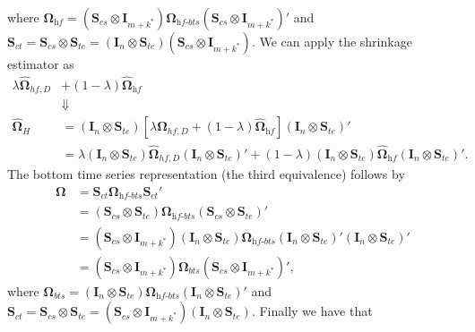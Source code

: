 \documentclass[a4paper,11pt]{article}
\newcommand{\Ivet}{\bm{I}}
\newcommand{\Svet}{\bm{S}}
\newcommand{\Omegavet}{\bm{\Omega}}
\theoremstyle{definition}
\begin{document}
where $\Omegavet_{\textit{hf}} = \left(\Svet_{cs} \otimes \Ivet_{m+k^\ast}\right)\Omegavet_{\textit{hf-bts}}\left(\Svet_{cs} \otimes \Ivet_{m+k^\ast}\right)'$ and $\Svet_{ct} = \Svet_{cs} \otimes \Svet_{te} = \left(\Ivet_n \otimes \Svet_{te}\right)\left(\Svet_{cs} \otimes \Ivet_{m+k^\ast}\right)$. We can apply the shrinkage estimator as
\begin{align*}
	\lambda \widehat{\Omegavet}_{hf, D} &+ (1-\lambda) \widehat{\Omegavet}_{\textit{hf}}\\
	&\Downarrow\\
	\widehat{\Omegavet}_{H} & = (\Ivet_{n} \otimes \Svet_{te})\left[\lambda \widehat{\Omegavet}_{hf, D} + (1-\lambda) \widehat{\Omegavet}_{\textit{hf}}\right] (\Ivet_{n} \otimes \Svet_{te})'                                                                                                            \\
	                        & = \lambda (\Ivet_{n} \otimes \Svet_{te})\widehat{\Omegavet}_{hf, D}(\Ivet_{n} \otimes \Svet_{te})' + (1-\lambda) (\Ivet_{n} \otimes \Svet_{te})\widehat{\Omegavet}_{\textit{hf}}(\Ivet_{n} \otimes \Svet_{te})'.
\end{align*}
The bottom time series representation (the third equivalence) follows by
\begin{align*}
	\Omegavet & = \Svet_{ct}\Omegavet_{\textit{hf-bts}}\Svet_{ct}'                                                                                                                                                   \\
	          & = \left(\Svet_{cs} \otimes \Svet_{te}\right)\Omegavet_{\textit{hf-bts}}\left(\Svet_{cs} \otimes \Svet_{te}\right)'                                                                                   \\
	          & = \left(\Svet_{cs} \otimes \Ivet_{m+k^\ast}\right)\left(\Ivet_n \otimes \Svet_{te}\right)\Omegavet_{\textit{hf-bts}}\left(\Ivet_n \otimes \Svet_{te}\right)'\left(\Ivet_n \otimes \Svet_{te}\right)' \\
	          & = \left(\Svet_{cs} \otimes \Ivet_{m+k^\ast}\right)\Omegavet_{bts}\left(\Svet_{cs} \otimes \Ivet_{m+k^\ast}\right)',
\end{align*}
where $\Omegavet_{bts} = \left(\Ivet_n \otimes \Svet_{te}\right)\Omegavet_{\textit{hf-bts}}\left(\Ivet_n \otimes \Svet_{te}\right)'$ and $\Svet_{ct} = \Svet_{cs} \otimes \Svet_{te} = \left(\Svet_{cs} \otimes \Ivet_{m+k^\ast}\right)\left(\Ivet_n \otimes \Svet_{te}\right)$. Finally we have that
\end{document}
